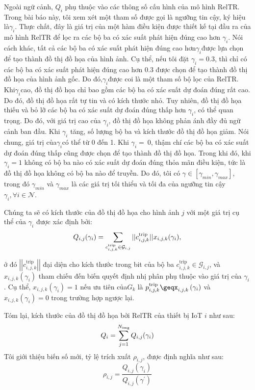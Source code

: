 \documentclass{article} %
\begin{document}
Ngoài ngữ cảnh, $Q_i$  phụ thuộc vào các thông số cấu hình của mô hình RelTR. Trong bài báo này, tôi xem xét một tham số được gọi là ngưỡng tin cậy, ký hiệu là$ \gamma_i $. Thực chất, đây là giá trị của một hàm điều kiện được thiết kế tại đầu ra của mô hình RelTR để lọc ra các bộ ba có xác suất phát hiện đúng cao hơn $\gamma_i$. Nói cách khác, tất cả các bộ ba có xác suất phát hiện đúng cao hơn$ \gamma_i $được lựa chọn để tạo thành đồ thị đồ họa của hình ảnh. Cụ thể, nếu tôi đặt $\gamma_i=0.3$, thì chỉ có các bộ ba có xác suất phát hiện đúng cao hơn 0.3 được chọn để tạo thành đồ thị đồ họa của hình ảnh gốc. Do đó,$ \gamma_i $được coi là một tham số bộ lọc của RelTR. Khi$ \gamma_i $cao, đồ thị đồ họa chỉ bao gồm các bộ ba có xác suất dự đoán đúng rất cao. Do đó, đồ thị đồ họa rất tự tin và có kích thước nhỏ. Tuy nhiên, đồ thị đồ họa thiếu và bỏ lỡ các bộ ba có xác suất dự đoán đúng thấp hơn $\gamma_i$, có thể quan trọng. Do đó, với giá trị cao của $\gamma_i$, đồ thị đồ họa không phản ánh đầy đủ ngữ cảnh ban đầu. Khi $ \gamma_i $ tăng, số lượng bộ ba và kích thước đồ thị đồ họa giảm. Nói chung, giá trị của$ \gamma_i $có thể từ 0 đến 1. Khi $\gamma_i=\ 0$, thậm chí các bộ ba có xác suất dự đoán đúng thấp cũng được chọn để tạo thành đồ thị đồ họa. Trong khi đó, khi $\gamma_i=1$ không có bộ ba nào có xác suất dự đoán đúng thỏa mãn điều kiện, tức là đồ thị đồ họa không có bộ ba nào để truyền. Do đó, tôi có $\gamma\in\left[\gamma_{min},\gamma_{max}\right]$, trong đó $\gamma_{min}$ và $\gamma_{max}$ là các giá trị tối thiểu và tối đa của ngưỡng tin cậy $\gamma_i,\forall i \in \mathcal{N}$.

Chúng ta sẽ có kích thước của đồ thị đồ họa cho hình ảnh $j$ với một giá trị cụ thể của $\gamma_i $ được xác định bởi:
\begin{equation}
Q_{i, j} (\gamma_{i})= \sum_{c^{\rm{trip}}_{i,j,k} \in \mathcal{G}_{i,j}} ||c^{\rm{trip}}_{i,j,k}||x_{i,j,k}(\gamma_i),
\end{equation}

ở đó $\left|\left|c_{i,j,k}^{\mathrm{trip}}\right|\right|$ đại diện cho kích thước trong bit của bộ ba $c_{i,j,k}^{\mathrm{trip}}\in\mathcal{G}_{i,j}$, và $x_{i,j,k}\left(\gamma_i\right)$ tham chiếu đến biến quyết định nhị phân phụ thuộc vào giá trị của $\gamma_i$. Cụ thể, $x_{i,j,k}\left(\gamma_i\right)=1$ nếu ưu tiên của$ G_k$ là $p_{i,j,k}^{\mathrm{trip}}\geqx_{i,j,k}\left(\gamma_i\right)$ và $x_{i,j,k}\left(\gamma_i\right)=0$ trong trường hợp ngược lại.

Tóm lại, kích thước của đồ thị đồ họa bởi RelTR của thiết bị IoT $i$ như sau:
\begin{equation}
Q_{i}= \sum_{j=1}^{N_{\rm{img}}} Q_{i, j}(\gamma_{i})
\end{equation}
Tôi giới thiệu biến số mới, tỷ lệ trích xuất $\rho_{i,j}$, được định nghĩa như sau:
\begin{equation}
\rho_{i,j}=\frac{{Q}_{i,j}\left(\mathcal{\gamma}_{i}\right)}{{Q}_{i,j}\left(\mathcal{\gamma}^{'}\right)}
\end{equation}
\end{document}
